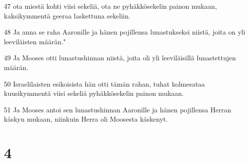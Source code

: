 \par 47 ota miestä kohti viisi sekeliä, ota ne pyhäkkösekelin painon mukaan, kaksikymmentä geeraa laskettuna sekeliin.
\par 48 Ja anna se raha Aaronille ja hänen pojillensa lunastukseksi niistä, joita on yli leeviläisten määrän."
\par 49 Ja Mooses otti lunastushinnan niistä, joita oli yli leeviläisillä lunastettujen määrän.
\par 50 Israelilaisten esikoisista hän otti tämän rahan, tuhat kolmesataa kuusikymmentä viisi sekeliä pyhäkkösekelin painon mukaan.
\par 51 Ja Mooses antoi sen lunastushinnan Aaronille ja hänen pojillensa Herran käskyn mukaan, niinkuin Herra oli Moosesta käskenyt.

\chapter{4}

